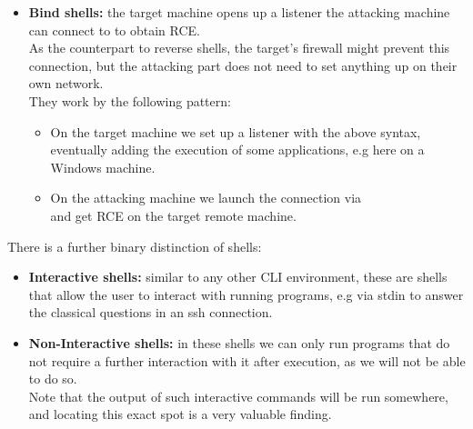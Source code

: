 {\begin{itemize}
They work as follows: 
	\begin{itemize}
	\item On the attacking machine we set up a so-called reverse listener to catch the shell via\\
	\\
	(usually with port 443 as the default for examples)
	\item On the target machine we send a reverse shell, be it through a CLI (not too likely) or rather a remote website or similar with the syntax:\\
	\end{itemize}
\item \textbf{Bind shells:} the target machine opens up a listener the attacking machine can connect to to obtain RCE.\\
As the counterpart to reverse shells, the target's firewall might prevent this connection, but the attacking part does not need to set anything up on their own network.\\
They work by the following pattern:
	\begin{itemize}
	\item On the target machine we set up a listener with the above syntax, eventually adding the execution of some applications, e.g here  on a Windows machine.\\
	\item On the attacking machine we launch the connection via \\
	and get RCE on the target remote machine.
	\end{itemize}
\end{itemize}
There is a further binary distinction of shells:
\begin{itemize}
\item \textbf{Interactive shells:} similar to any other CLI environment, these are shells that allow the user to interact with running programs, e.g via stdin to answer the classical  questions in an ssh connection.
\item \textbf{Non-Interactive shells:} in these shells we can only run programs that do not require a further interaction with it after execution, as we will not be able to do so. \\
Note that the output of such interactive commands will be run somewhere, and locating this exact spot is a very valuable finding.
\end{itemize}

}
